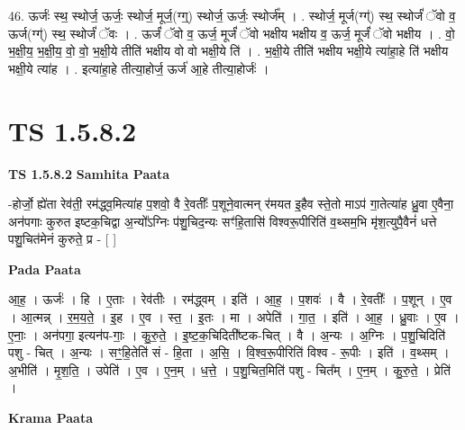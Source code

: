 \documentclass[17pt]{extarticle}
\begin{document}
46. ऊर्जः॑ स्थ॒ स्थोर्ज॒ ऊर्जः॒ स्थोर्ज॒ मूर्ज॒(ग्ग्॒) स्थोर्ज॒ ऊर्जः॒ स्थोर्ज᳚म् । . स्थोर्ज॒ मूर्ज(ग्ग्॑) स्थ॒ स्थोर्जं॑ ॅवो व॒ ऊर्ज(ग्ग्॑) स्थ॒ स्थोर्जं॑ ॅवः । . ऊर्जं॑ ॅवो व॒ ऊर्ज॒ मूर्जं॑ ॅवो भक्षीय भक्षीय व॒ ऊर्ज॒ मूर्जं॑ ॅवो भक्षीय । . वो॒ भ॒क्षी॒य॒ भ॒क्षी॒य॒ वो॒ वो॒ भ॒क्षी॒ये तीति॑ भक्षीय वो वो भक्षी॒ये ति॑ । . भ॒क्षी॒ये तीति॑ भक्षीय भक्षी॒ये त्या॑हा॒हे ति॑ भक्षीय भक्षी॒ये त्या॑ह । . इत्या॑हा॒हे तीत्या॒होर्ज॒ ऊर्ज॑ आ॒हे तीत्या॒होर्जः॑ । \newline
\pagebreak
{}

\section{ TS 1.5.8.2 }

\textbf{TS 1.5.8.2 } \newline
\textbf{Samhita Paata} \newline

-होर्जो॒ ह्ये॑ता रेव॑ती॒ रम॑द्ध्व॒मित्या॑ह प॒शवो॒ वै रे॒वतीः᳚ प॒शूने॒वात्मन् र॑मयत इ॒हैव स्ते॒तो माऽप॑ गा॒तेत्या॑ह ध्रु॒वा ए॒वैना॒ अन॑पगाः कुरुत इष्टक॒चिद्वा अ॒न्यो᳚ऽग्निः प॑शु॒चिद॒न्यः सꣳ॑हि॒तासि॑ विश्वरू॒पीरिति॑ व॒थ्सम॒भि मृ॑श॒त्युपै॒वैनं॑ धत्ते पशु॒चित॑मेनं कुरुते॒ प्र - [ ] \newline

\textbf{Pada Paata} \newline

आ॒ह॒ । ऊर्जः॑ । हि । ए॒ताः । रेव॑तीः । रम॑द्ध्वम् । इति॑ । आ॒ह॒ । प॒शवः॑ । वै । रे॒वतीः᳚ । प॒शून् । ए॒व । आ॒त्मन्न् । र॒म॒य॒ते॒ । इ॒ह । ए॒व । स्त॒ । इ॒तः । मा । अपेति॑ । गा॒त॒ । इति॑ । आ॒ह॒ । ध्रु॒वाः । ए॒व । ए॒नाः॒ । अन॑पगा॒ इत्यन॑प-गाः॒ । कु॒रु॒ते॒ । इ॒ष्ट॒क॒चिदिती᳚ष्टक-चित् । वै । अ॒न्यः । अ॒ग्निः । प॒शु॒चिदिति॑ पशु - चित् । अ॒न्यः । सꣳ॒॒हि॒तेति॑ सं - हि॒ता । अ॒सि॒ । वि॒श्व॒रू॒पीरिति॑ विश्व - रू॒पीः । इति॑ । व॒थ्सम् । अ॒भीति॑ । मृ॒श॒ति॒ । उपेति॑ । ए॒व । ए॒न॒म् । ध॒त्ते॒ । प॒शु॒चित॒मिति॑ पशु - चित᳚म् । ए॒न॒म् । कु॒रु॒ते॒ । प्रेति॑ ।  \newline


\textbf{Krama Paata} \newline
\end{document}
